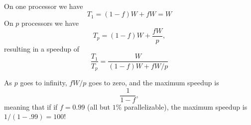\documentclass[%
oneside,                 %
final,                   %
10pt]{article}
\begin{document}
\paragraph{}
On one processor we have 
\[
T_1 = (1-f)W + fW = W
\]
On $p$ processors we have
\[
T_p = (1-f)W + \frac{fW}{p},
\]
resulting in a speedup of 
\[
\frac{T_1}{T_p} = \frac{W}{(1-f)W+fW/p}
\]

As $p$ goes to infinity, $fW/p$ goes to zero, and the maximum speedup is
\[
\frac{1}{1-f},
\]
meaning that if 
if $f = 0.99$ (all but $1\%$ parallelizable), the maximum speedup
is $1/(1-.99)=100$!




\end{document}
